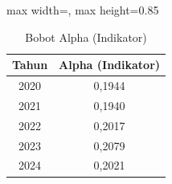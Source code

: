 \begin{table}[H]
\centering
\caption{Bobot Alpha (Indikator)} \label{tab:appalpha_s}
\begin{adjustbox}{max width=\textwidth, max height=0.85\textheight}
\begin{tabular}{|c|c|}
\hline
\textbf{Tahun} & \textbf{Alpha (Indikator)} \\
\hline
2020 & 0,1944 \\
2021 & 0,1940 \\
2022 & 0,2017 \\
2023 & 0,2079 \\
2024 & 0,2021 \\
\hline
\end{tabular}
\end{adjustbox}
\end{table}
